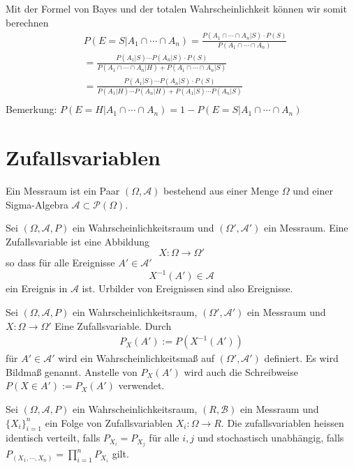 Mit der Formel von Bayes und der totalen Wahrscheinlichkeit  können wir somit berechnen
\begin{align*}
& P(E=S |  A_1 \cap \cdots \cap A_n) = \frac{P(A_1 \cap \cdots \cap A_n | S) \cdot P(S)}{P(A_1 \cap \cdots \cap A_n)} \\
&=  \frac{P(A_1 | S) \cdots P(A_n | S) \cdot P(S)}{P(A_1 \cap \cdots \cap A_n | H) + P(A_1 \cap \cdots \cap A_n | S)} \\
&=  \frac{P(A_1 | S) \cdots P(A_n | S) \cdot P(S)}{P(A_1 | H) \cdots P(A_n | H)  + P(A_1 | S) \cdots P(A_n | S) } \\
\end{align*}
Bemerkung: $P(E=H |  A_1 \cap \cdots \cap A_n) = 1- P(E=S |  A_1 \cap \cdots \cap A_n) $


\section{Zufallsvariablen}

\begin{Definition}
Ein Messraum ist ein Paar $(\Omega, \mathcal{A})$ bestehend aus einer Menge $\Omega$ und einer Sigma-Algebra $\mathcal{A} \subset \mathcal{P}(\Omega)$.
\end{Definition}



\begin{Definition}
Sei $(\Omega, \mathcal{A}, P)$ ein Wahrscheinlichkeitsraum und $(\Omega', \mathcal{A}')$ ein Messraum. Eine Zufallsvariable ist eine Abbildung
$$X : \Omega \to \Omega'$$ 
so dass für alle Ereignisse $A' \in  \mathcal{A}'$
$$ X^{-1} (A') \in \mathcal{A}$$
 ein Ereignis in $\mathcal{A}$ ist. Urbilder von Ereignissen sind also Ereignisse.
\end{Definition}

\begin{Definition}
Sei $(\Omega, \mathcal{A}, P)$ ein Wahrscheinlichkeitsraum, $(\Omega', \mathcal{A}')$ ein Messraum und  $X : \Omega \to \Omega'$  Eine Zufallsvariable. 
Durch 
\begin{align*}
P_X (A') := P(X^{-1} (A'))
\end{align*}
 für $A' \in \mathcal{A}'$ wird ein Wahrscheinlichkeitsmaß auf  $(\Omega', \mathcal{A}')$ definiert. Es wird Bildmaß genannt. Anstelle von $P_X (A')$ wird auch die Schreibweise $P (X \in A'):= P_X (A')$ verwendet.
\end{Definition}

\begin{Definition}
Sei $(\Omega, \mathcal{A}, P)$ ein Wahrscheinlichkeitsraum, $(R, \mathcal{B})$ ein Messraum  und
 $\{X_i\}_{i=1}^n$ ein Folge von Zufallsvariablen   $X_i :  \Omega \to R$.
Die zufallsvariablen heissen identisch verteilt, falls
 $P_{X_i} = P_{X_j}$ für alle $i,j$  und
stochastisch unabhängig, falls
 $P_{(X_1, \cdots ,X_n)} = \prod_{i=1}^n P_{X_i}$ gilt. 
\end{Definition}



